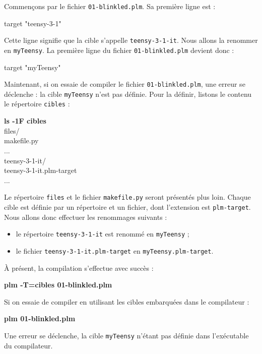 Commençons par le fichier \texttt{01-blinkled.plm}. Sa première ligne est :

\begin{PLM}[1]
target "teensy-3-1"
\end{PLM}

Cette ligne signifie que la cible s'appelle \texttt{teensy-3-1-it}. Nous allons la renommer en \texttt{myTeensy}. La première ligne du fichier \texttt{01-blinkled.plm} devient donc :

\begin{PLM}[1]
target "myTeensy"
\end{PLM}

Maintenant, si on essaie de compiler le fichier \texttt{01-blinkled.plm}, une erreur se déclenche : la cible \texttt{myTeensy} n'est pas définie. Pour la définir, listons le contenu le répertoire \texttt{cibles} :
\begin{SHELL}
{\bfseries ls -1F cibles}\\
f{}iles/\\
makef{}ile.py\\
...\\
teensy-3-1-it/\\
teensy-3-1-it.plm-target\\
...
\end{SHELL}

Le répertoire \texttt{f{}iles} et le fichier \texttt{makef{}ile.py} seront présentés plus loin. Chaque cible est définie par un répertoire et un fichier, dont l'extension est \texttt{plm-target}. Nous allons donc effectuer les renommages suivants :
\begin{itemize}
  \item le répertoire \texttt{teensy-3-1-it} est renommé en \texttt{myTeensy} ;
  \item le fichier \texttt{teensy-3-1-it.plm-target} en \texttt{myTeensy.plm-target}.
\end{itemize}

À présent, la compilation s'effectue avec succès :
\begin{SHELL}
\bfseries plm -T=cibles 01-blinkled.plm
\end{SHELL}

Si on essaie de compiler en utilisant les cibles embarquées dans le compilateur :
\begin{SHELL}
\bfseries plm 01-blinkled.plm
\end{SHELL}

Une erreur se déclenche, la cible \texttt{myTeensy} n'étant pas définie dans l'exécutable du compilateur.






